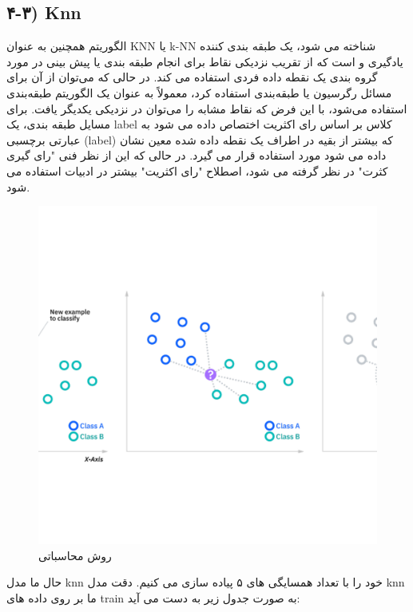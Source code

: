 \documentclass{article}
\begin{document}
\subsection{۴-۳) Knn}
الگوریتم  همچنین به عنوان KNN یا k-NN شناخته می شود، یک طبقه بندی کننده یادگیری  و  است که از تقریب نزدیکی نقاط برای انجام طبقه بندی یا پیش بینی در مورد گروه بندی یک نقطه داده فردی استفاده می کند.\newline
در حالی که می‌توان از آن برای مسائل رگرسیون یا طبقه‌بندی استفاده کرد، معمولاً به عنوان یک الگوریتم طبقه‌بندی استفاده می‌شود، با این فرض که نقاط مشابه را می‌توان در نزدیکی یکدیگر یافت.\newline
برای مسایل طبقه بندی، یک label کلاس بر اساس رای اکثریت اختصاص داده می شود به عبارتی برچسبی (label) که بیشتر از بقیه در اطراف یک نقطه داده شده معین نشان داده می شود مورد استفاده قرار می گیرد. در حالی که این از نظر فنی "رای گیری کثرت" در نظر گرفته می شود، اصطلاح "رای اکثریت" بیشتر در ادبیات استفاده می شود.
\newpage
\begin{figure}[h]
	\centering
	\includegraphics[width=0.5\linewidth]{Photo/21}
	\caption[روش محاسباتی ]{روش محاسباتی }
	\label{fig:21}
\end{figure}
حال ما مدل knn خود را با تعداد همسایگی های ۵ پیاده سازی می کنیم.\newline
دقت مدل knn ما بر روی داده های train به صورت جدول زیر به دست می آید:\newline
\end{document}
